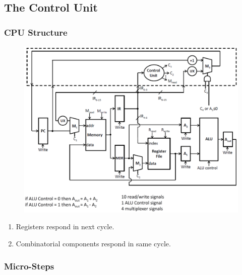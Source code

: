 \documentclass[twocolumn,english]{article}
\begin{document}
\subsection{The Control Unit}


\subsubsection{CPU Structure}

\begin{figure}[H]
\noindent \centering{}\includegraphics[scale=0.2]{img/cpu-hardware}
\end{figure}

\begin{enumerate}
\item Registers respond in next cycle.
\item Combinatorial components respond in same cycle.
\end{enumerate}

\subsubsection{Micro-Steps}
\end{document}
